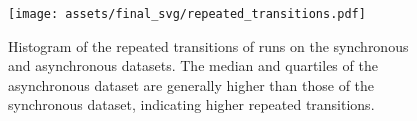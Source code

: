 \begin{figure}[!h]
    \centering
    \texttt{[image: assets/final\_svg/repeated\_transitions.pdf]}
    \caption{Histogram of the repeated transitions of \gptfo{} \react{} runs on the synchronous and asynchronous datasets. The median and quartiles of the asynchronous dataset are generally higher than those of the synchronous dataset, indicating higher repeated transitions.}
    \label{fig:histogram_repeated_transitions}
\end{figure}